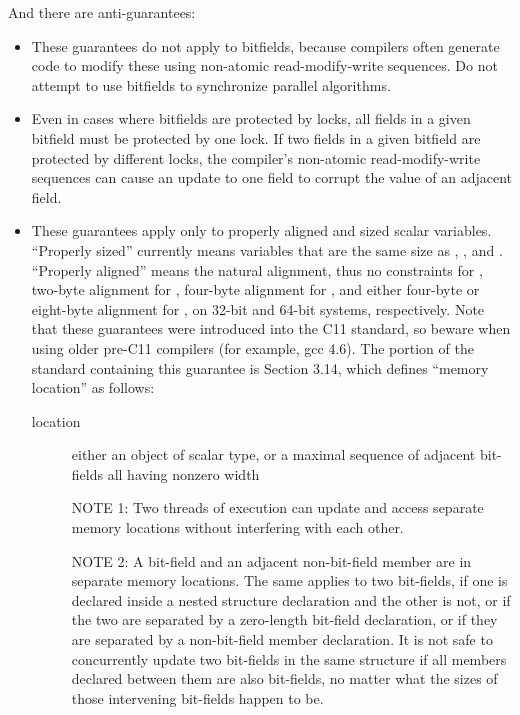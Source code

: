 And there are anti-guarantees:

\begin{itemize}
 \item These guarantees do not apply to bitfields, because compilers often
       generate code to modify these using non-atomic read-modify-write
       sequences.
       Do not attempt to use bitfields to synchronize parallel algorithms.

 \item Even in cases where bitfields are protected by locks, all fields
       in a given bitfield must be protected by one lock.
       If two fields in a given bitfield are protected by different locks,
       the compiler's non-atomic read-modify-write sequences can cause
       an update to one field to corrupt the value of an adjacent field.

 \item These guarantees apply only to properly aligned and sized scalar
       variables.
       ``Properly sized'' currently means variables that are the same size
       as , ,  and .
       ``Properly aligned'' means the natural alignment, thus no
       constraints for , two-byte alignment for ,
       four-byte alignment for , and either four-byte or eight-byte
       alignment for , on 32-bit and 64-bit systems, respectively.
       Note that these guarantees were introduced into the C11 standard,
       so beware when using older pre-C11 compilers (for example, gcc 4.6).
       The portion of the standard containing this guarantee is
       Section 3.14, which defines ``memory location'' as follows:

       \begin{description}
     	\item [location] \hfill
		either an object of scalar type, or a maximal sequence
		of adjacent bit-fields all having nonzero width

		NOTE 1: Two threads of execution can update and access
		separate memory locations without interfering with
		each other.

		NOTE 2: A bit-field and an adjacent non-bit-field member
		are in separate memory locations. The same applies
		to two bit-fields, if one is declared inside a nested
		structure declaration and the other is not, or if the two
		are separated by a zero-length bit-field declaration,
		or if they are separated by a non-bit-field member
		declaration. It is not safe to concurrently update two
		bit-fields in the same structure if all members declared
		between them are also bit-fields, no matter what the
		sizes of those intervening bit-fields happen to be.
       \end{description}
\end{itemize}

